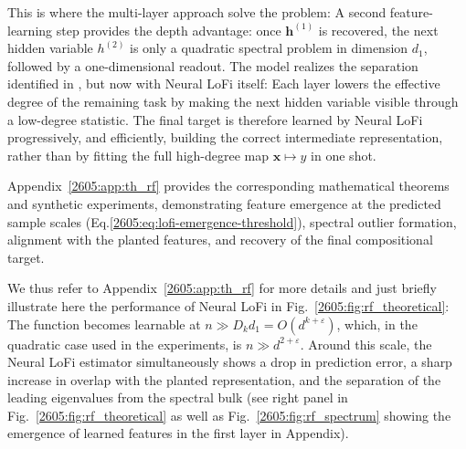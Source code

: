 This is where the multi-layer approach solve the problem: A second feature-learning step provides the depth advantage: once $\bm h^{(1)}$ is recovered, the next hidden variable $h^{(2)}$ is only a quadratic spectral problem in dimension $d_1$, followed by a one-dimensional readout. The model realizes the separation identified in \cite{tabanelli2026deep}, but now with Neural LoFi itself: Each layer lowers the effective degree of the remaining task by making the next hidden variable visible through a low-degree statistic. The final target is therefore learned by Neural LoFi progressively, and efficiently, building the correct intermediate representation, rather than by fitting the full high-degree map $\bm x\mapsto y$ in one shot. 

Appendix~\ref{2605:app:th_rf} provides the corresponding mathematical theorems and synthetic experiments, demonstrating feature emergence at the predicted sample scales (Eq.\ref{2605:eq:lofi-emergence-threshold}), spectral outlier formation, alignment with the planted features, and recovery of the final compositional target. 

We thus refer to Appendix~\ref{2605:app:th_rf} for more details  and just briefly illustrate here the performance of Neural LoFi in Fig.~\ref{2605:fig:rf_theoretical}: The function becomes learnable at \(n\gg D_k d_1=O(d^{k+\varepsilon})\), which, in the quadratic case used in the experiments, is \(n\gg d^{2+\varepsilon}\). Around this scale, the Neural LoFi estimator simultaneously shows a drop in prediction error, a sharp increase in overlap with the planted representation, and the separation of the leading eigenvalues from the spectral bulk (see right panel in Fig.~\ref{2605:fig:rf_theoretical} as well as Fig.~\ref{2605:fig:rf_spectrum} showing the emergence of learned features in the first layer in Appendix). 



